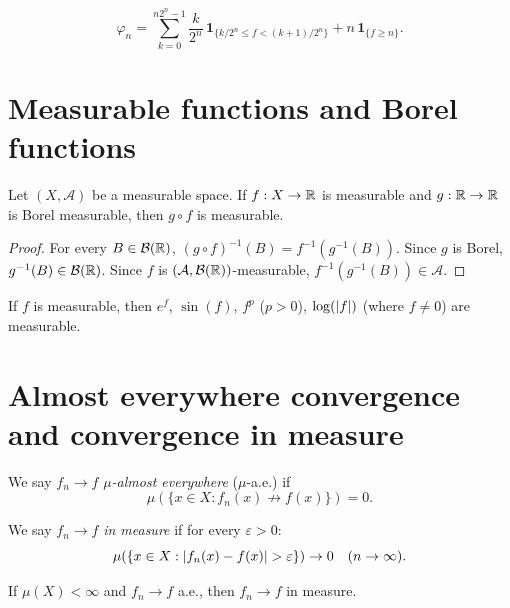 \begin{keyformulas}[title=\textbf{Approximation construction}]
\[
\varphi_n = \sum_{k=0}^{n2^n - 1} \frac{k}{2^n}\, \mathbf{1}_{\{k/2^n \leq f <
(k+1)/2^n\}} + n\, \mathbf{1}_{\{f \geq n\}}.
\]
\end{keyformulas}

\section{Measurable functions and Borel functions}

\begin{proposition}
Let $(X, \mathcal{A})$ be a measurable space. If $f : X \to \mathbb{R}$ is measurable and
$g : \mathbb{R} \to \mathbb{R}$ is Borel measurable, then $g \circ f$ is measurable.
\end{proposition}

\begin{proof}
For every $B \in \mathcal{B}(\mathbb{R})$, $(g \circ f)^{-1}(B) = f^{-1}(g^{-1}(B))$.
Since $g$ is Borel, $g^{-1}(B) \in \mathcal{B}(\mathbb{R})$. Since $f$ is
$(\mathcal{A}, \mathcal{B}(\mathbb{R}))$-measurable, $f^{-1}(g^{-1}(B)) \in \mathcal{A}$.
\end{proof}

\begin{corollary}
If $f$ is measurable, then $e^f$, $\sin(f)$, $f^p$ ($p > 0$), $\log(\left| f \right|)$
(where $f \neq 0$) are measurable.
\end{corollary}

\section{Almost everywhere convergence and convergence in measure}

\begin{definition}
We say $f_n \to f$ \emph{$\mu$-almost everywhere} ($\mu$-a.e.) if
\[
\mu\!\left(\{x \in X : f_n(x) \not\to f(x)\}\right) = 0.
\]
\end{definition}

\begin{definition}
We say $f_n \to f$ \emph{in measure} if for every $\varepsilon > 0$:
\[
\mu\!\left(\{x \in X : \left| f_n(x) - f(x) \right| > \varepsilon\}\right) \to 0
\quad (n \to \infty).
\]
\end{definition}

\begin{theorem}
If $\mu(X) < \infty$ and $f_n \to f$ a.e., then $f_n \to f$ in measure.
\end{theorem}

